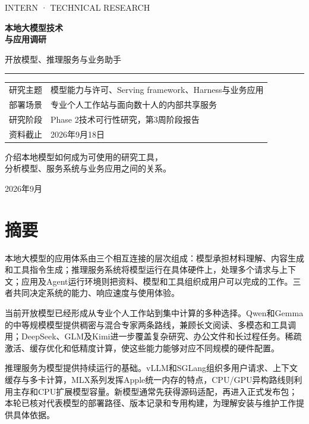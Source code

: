 \documentclass[11pt,a4paper,fontset=none]{ctexart}
\begin{document}
\hypersetup{pageanchor=false}
\begin{titlepage}
\thispagestyle{empty}\setlength{\parindent}{0pt}
\vspace*{16mm}
{\sffamily\large\color{teal}INTERN · TECHNICAL RESEARCH\par}
\vspace{19mm}
{\Huge\bfseries\color{navy}本地大模型技术\\[5pt]与应用调研\par}
\vspace{9mm}
{\Large\color{muted}开放模型、推理服务与业务助手\par}
\vspace{14mm}\textcolor{teal}{\rule{\linewidth}{2pt}}\vspace{8mm}
\begin{tabularx}{\linewidth}{@{}P{28mm}Y@{}}
研究主题 & 模型能力与许可、Serving framework、Harness与业务应用\\
部署场景 & 专业个人工作站与面向数十人的内部共享服务\\
研究阶段 & Phase 2技术可行性研究，第3周阶段报告\\
资料截止 & 2026年9月18日\\
\end{tabularx}
\vfill
{\large\color{navy}介绍本地模型如何成为可使用的研究工具，\\[4pt]分析模型、服务系统与业务应用之间的关系。\par}
\vspace{16mm}
{\small\color{muted}2026年9月\par}
\end{titlepage}
\hypersetup{pageanchor=true}
\setcounter{page}{1}

\section*{摘要}
本地大模型的应用体系由三个相互连接的层次组成：模型承担材料理解、内容生成和工具指令生成；推理服务系统将模型运行在具体硬件上，处理多个请求与上下文；应用及Agent运行环境则把资料、模型和工具组织成用户可以完成的工作。三者共同决定系统的能力、响应速度与使用体验。

当前开放模型已经形成从专业个人工作站到集中计算的多种选择。Qwen和Gemma的中等规模模型提供稠密与混合专家两条路线，兼顾长文阅读、多模态和工具调用；DeepSeek、GLM及Kimi进一步覆盖复杂研究、办公文件和长过程任务。稀疏激活、缓存优化和低精度计算，使这些能力能够对应不同规模的硬件配置。

推理服务为模型提供持续运行的基础。vLLM和SGLang组织多用户请求、上下文缓存与多卡计算，MLX系列发挥Apple统一内存的特点，CPU/GPU异构路线则利用主存和CPU扩展模型容量。新模型通常先获得源码适配，再进入正式发布包；本轮已核对代表模型的部署路径、版本记录和专用构建，为理解安装与维护工作提供具体依据。
\end{document}
